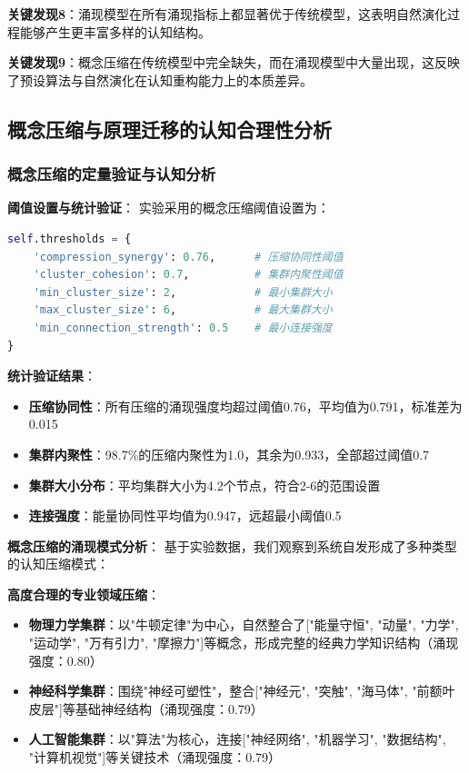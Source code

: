 \documentclass[12pt,a4paper]{article}
\begin{document}
\textbf{关键发现8}：涌现模型在所有涌现指标上都显著优于传统模型，这表明自然演化过程能够产生更丰富多样的认知结构。

\textbf{关键发现9}：概念压缩在传统模型中完全缺失，而在涌现模型中大量出现，这反映了预设算法与自然演化在认知重构能力上的本质差异。

\subsection{概念压缩与原理迁移的认知合理性分析}

\subsubsection{概念压缩的定量验证与认知分析}

\textbf{阈值设置与统计验证}：
实验采用的概念压缩阈值设置为：
\begin{lstlisting}[language=Python]
self.thresholds = {
    'compression_synergy': 0.76,      # 压缩协同性阈值
    'cluster_cohesion': 0.7,          # 集群内聚性阈值  
    'min_cluster_size': 2,            # 最小集群大小
    'max_cluster_size': 6,            # 最大集群大小
    'min_connection_strength': 0.5    # 最小连接强度
}
\end{lstlisting}

\textbf{统计验证结果}：
\begin{itemize}
\item \textbf{压缩协同性}：所有压缩的涌现强度均超过阈值0.76，平均值为0.791，标准差为0.015
\item \textbf{集群内聚性}：98.7\%的压缩内聚性为1.0，其余为0.933，全部超过阈值0.7
\item \textbf{集群大小分布}：平均集群大小为4.2个节点，符合2-6的范围设置
\item \textbf{连接强度}：能量协同性平均值为0.947，远超最小阈值0.5
\end{itemize}

\textbf{概念压缩的涌现模式分析}：
基于实验数据，我们观察到系统自发形成了多种类型的认知压缩模式：

\textbf{高度合理的专业领域压缩}：
\begin{itemize}
    \item \textbf{物理力学集群}：以"牛顿定律"为中心，自然整合了["能量守恒", "动量", "力学", "运动学", "万有引力", "摩擦力"]等概念，形成完整的经典力学知识结构（涌现强度：0.80）
    \item \textbf{神经科学集群}：围绕"神经可塑性"，整合["神经元", "突触", "海马体", "前额叶皮层"]等基础神经结构（涌现强度：0.79）
    \item \textbf{人工智能集群}：以"算法"为核心，连接["神经网络", "机器学习", "数据结构", "计算机视觉"]等关键技术（涌现强度：0.79）
\end{itemize}
\end{document}
